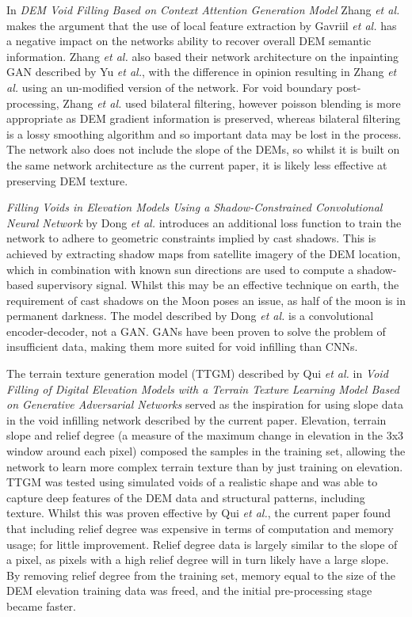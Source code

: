 \documentclass[twocolumn]{article}
\begin{document}
In \emph{DEM Void Filling Based on Context Attention Generation Model} Zhang \emph{et al.}\autocite{zhangVoidFillingBased2020} makes the argument that the use of local feature extraction by Gavriil \emph{et al.}\autocite{gavriilVoidFillingDigital2019} has a negative impact on the networks ability to recover overall DEM semantic information.
Zhang \emph{et al.} also based their network architecture on the inpainting GAN described by Yu \emph{et al.}\autocite{yuGenerativeImageInpainting2018}, with the difference in opinion resulting in Zhang \emph{et al.} using an un-modified version of the network.
For void boundary post-processing,  Zhang \emph{et al.} used bilateral filtering, however poisson blending is more appropriate as DEM gradient information is preserved, whereas bilateral filtering is a lossy smoothing algorithm and so important data may be lost in the process.
The network also does not include the slope of the DEMs, so whilst it is built on the same network architecture as the current paper, it is likely less effective at preserving DEM texture.

\emph{Filling Voids in Elevation Models Using a Shadow-Constrained Convolutional Neural Network} by Dong \emph{et al.}\autocite{dongFillingVoidsElevation2020} introduces an additional loss function to train the network to adhere to geometric constraints implied by cast shadows.
This is achieved by extracting shadow maps from satellite imagery of the DEM location, which in combination with known sun directions are used to compute a shadow-based supervisory signal.
Whilst this may be an effective technique on earth, the requirement of cast shadows on the Moon poses an issue, as half of the moon is in permanent darkness.
The model described by Dong \emph{et al.} is a convolutional encoder-decoder, not a GAN.
GANs have been proven to solve the problem of insufficient data\autocite{nandhiniabiramiDeepCNNDeep2021}, making them more suited for void infilling than CNNs.

The terrain texture generation model (TTGM) described by Qui \emph{et al.} in \emph{Void Filling of Digital Elevation Models with a Terrain Texture Learning Model Based on Generative Adversarial Networks}\autocite{qiuVoidFillingDigital2019} served as the inspiration for using slope data in the void infilling network described by the current paper.
Elevation, terrain slope and relief degree (a measure of the maximum change in elevation in the 3x3 window around each pixel) composed the samples in the training set, allowing the network to learn more complex terrain texture than by just training on elevation.
TTGM was tested using simulated voids of a realistic shape and was able to capture deep features of the DEM data and structural patterns, including texture.
Whilst this was proven effective by Qui \emph{et al.}, the current paper found that including relief degree was expensive in terms of computation and memory usage; for little improvement.
Relief degree data is largely similar to the slope of a pixel, as pixels with a high relief degree will in turn likely have a large slope.
By removing relief degree from the training set, memory equal to the size of the DEM elevation training data was freed, and the initial pre-processing stage became faster.
\end{document}

